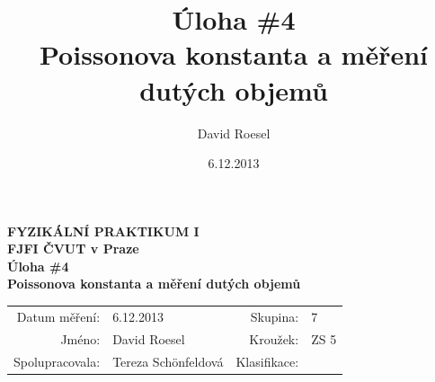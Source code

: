 \documentclass[english]{article}
\newcommand{\Author}{David Roesel}
\newcommand{\Coauthor}{Tereza Schönfeldová}
\newcommand{\Institute}{FJFI ČVUT v Praze}
\newcommand{\Subject}{FYZIKÁLNÍ PRAKTIKUM I}
\newcommand{\Group}{7}
\newcommand{\Circle}{ZS 5}
\newcommand{\Title}{Úloha \#4  \\Poissonova konstanta a měření dutých objemů}
\newcommand{\Date}{6.12.2013}
\begin{document}
\author{\Author}
\title{\Title}
\date{\Date}

\renewcommand{\figurename}{Obr.}
\renewcommand{\tablename}{Tab.}
\renewcommand{\refname}{Reference}


\setlength{\parindent}{0cm}
\begin{multicols}{2}
\textbf{\Subject \\
        \Institute \\[0.1cm]
\Title \\[0.5cm]
}
\begin{tabular}{rlrl}
\large Datum měření: & \Date & \large Skupina: & \Group \\
\large Jméno: & \Author & \large Kroužek:  & \Circle\\
\large Spolupracovala: & \Coauthor &\large Klasifikace:\\
\end{tabular}


\end{multicols}
\end{document}
